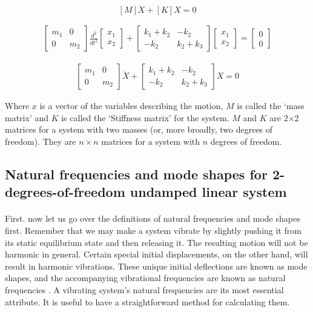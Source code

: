 \begin{equation}
\label{aad}
    [M]{\dot{X}}+[K]{X} = 0
\end{equation}

\begin{gather}
 \begin{bmatrix} m_1 & 0 \\ 0 & m_2 \end{bmatrix} \frac{d^2}{dt^2} \begin{bmatrix}
  x_1 \\ x_2
 \end{bmatrix} + \begin{bmatrix}
  k_1+k_2 & -k_2 \\ -k_2 & k_2+k_3
 \end{bmatrix}
 \begin{bmatrix}
  x_1 \\ x_2
 \end{bmatrix}
 =
  \begin{bmatrix}
0 \\0
   \end{bmatrix}
\end{gather}

\begin{gather}
    \begin{bmatrix}
m_1 & 0\\0& m_2 
\end{bmatrix}{\dot{X}} +
\begin{bmatrix}
k_1+k_2 &-k_2\\-k_2&k_2+k_3
\end{bmatrix}{X} = 0
\end{gather}


Where $x$ is a vector of the variables describing the motion,  $M$ is called the ‘mass matrix’ and $K$ is called the ‘Stiffness matrix’ for the system. $M$ and $K$ are 2$\times$2 matrices for a system with two masses (or, more broadly, two degrees of freedom). They are $n \times n$ matrices for a system with $n$ degrees of freedom.

\subsection{Natural frequencies and mode shapes for 2-degrees-of-freedom undamped linear system}
\paragraph{}

First. now let us go over the definitions of natural frequencies and mode shapes first. Remember that we may make a system vibrate by slightly pushing it from its static equilibrium state and then releasing it. The resulting motion will not be harmonic in general. Certain special initial displacements, on the other hand, will result in harmonic vibrations. These unique initial deflections are known as mode shapes, and the accompanying vibrational frequencies are known as natural frequencies \cite{kuether2014numerical} \cite{gigerenzer2011natural}. A vibrating system's natural frequencies are its most essential attribute. It is useful to have a straightforward method for calculating them.


